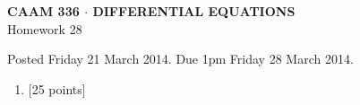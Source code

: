 \documentclass[10pt]{article}
\begin{document}
\vspace*{-5em}
\begin{center}
\large \textsf{\textbf{CAAM 336 $\cdot$ DIFFERENTIAL EQUATIONS}\\[0.5em]
Homework 28 }
\end{center}

Posted Friday 21 March 2014.  Due 1pm Friday 28 March 2014.

\begin{enumerate}\addtocounter{enumi}{27}
\item {[25 points]}  
\end{enumerate}
\end{document}
